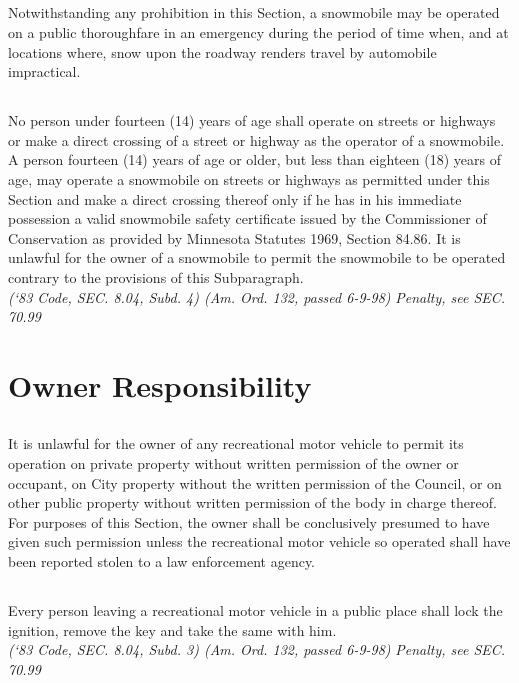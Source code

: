 \subsection{}
Notwithstanding any prohibition in this Section, a snowmobile may be operated on a public thoroughfare in an emergency during the period of time when, and at locations where, snow upon the roadway renders travel by automobile impractical.
\subsection{}
No person under fourteen (14) years of age shall operate on streets or highways or make a direct crossing of a street or highway as the operator of a snowmobile. A person fourteen (14) years of age or older, but less than eighteen (18) years of age, may operate a snowmobile on streets or highways as permitted under this Section and make a direct crossing thereof only if he has in his immediate possession a valid snowmobile safety certificate issued by the Commissioner of Conservation as provided by Minnesota Statutes 1969, Section 84.86. It is unlawful for the owner of a snowmobile to permit the snowmobile to be operated contrary to the provisions of this Subparagraph.\\
\emph{(‘83 Code, SEC. 8.04, Subd. 4) (Am. Ord. 132, passed 6-9-98)}
\emph{Penalty, see SEC. 70.99}
\section{Owner Responsibility}
\subsection{}
It is unlawful for the owner of any recreational motor vehicle to permit its operation on private property without written permission of the owner or occupant, on City property without the written permission of the Council, or on other public property without written permission of the body in charge thereof. For purposes of this Section, the owner shall be conclusively presumed to have given such permission unless the recreational motor vehicle so operated shall have been reported stolen to a law enforcement agency.
\subsection{}
Every person leaving a recreational motor vehicle in a public place shall lock the ignition, remove the key and take the same with him.\\
\emph{(‘83 Code, SEC. 8.04, Subd. 3) (Am. Ord. 132, passed 6-9-98)}
\emph{Penalty, see SEC. 70.99}
